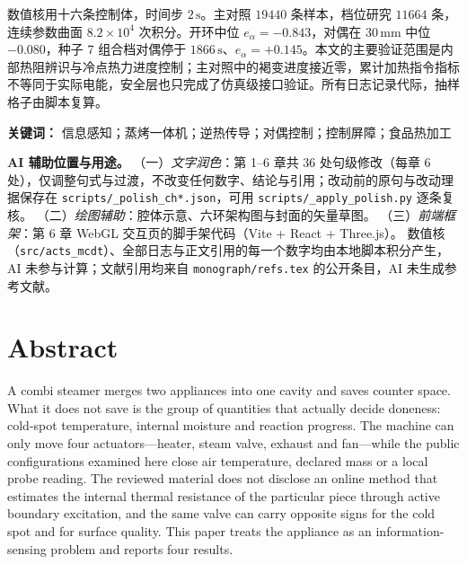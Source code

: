 数值核用十六条控制体，时间步 \(2\,\mathrm{s}\)。主对照 \(19440\) 条样本，档位研究 \(11664\) 条，连续参数曲面 \(8.2\times 10^{4}\) 次积分。开环中位 \(e_{\alpha}=-0.843\)，对偶在 \(30\,\mathrm{mm}\) 中位 \(-0.080\)，种子 7 组合档对偶停于 \(1866\,\mathrm{s}\)、\(e_{\alpha}=+0.145\)。本文的主要验证范围是内部热阻辨识与冷点热力进度控制；主对照中的褐变进度接近零，累计加热指令指标不等同于实际电能，安全层也只完成了仿真级接口验证。所有日志记录代际，抽样格子由脚本复算。

\noindent\textbf{关键词：} 信息感知；蒸烤一体机；逆热传导；对偶控制；控制屏障；食品热加工

\vspace{0.35em}
{\footnotesize\noindent\textbf{AI 辅助位置与用途。}
（一）\emph{文字润色}：第 1--6 章共 36 处句级修改（每章 6 处），仅调整句式与过渡，不改变任何数字、结论与引用；改动前的原句与改动理据保存在 \texttt{scripts/\_polish\_ch*.json}，可用 \texttt{scripts/\_apply\_polish.py} 逐条复核。
（二）\emph{绘图辅助}：腔体示意、六环架构图与封面的矢量草图。
（三）\emph{前端框架}：第 6 章 WebGL 交互页的脚手架代码（Vite + React + Three.js）。
数值核（\texttt{src/acts\_mcdt}）、全部日志与正文引用的每一个数字均由本地脚本积分产生，AI 未参与计算；文献引用均来自 \texttt{monograph/refs.tex} 的公开条目，AI 未生成参考文献。}

\chapter*{Abstract}

A combi steamer merges two appliances into one cavity and saves counter space. What it does not save is the group of quantities that actually decide doneness: cold-spot temperature, internal moisture and reaction progress. The machine can only move four actuators---heater, steam valve, exhaust and fan---while the public configurations examined here close air temperature, declared mass or a local probe reading. The reviewed material does not disclose an online method that estimates the internal thermal resistance of the particular piece through active boundary excitation, and the same valve can carry opposite signs for the cold spot and for surface quality. This paper treats the appliance as an information-sensing problem and reports four results.

